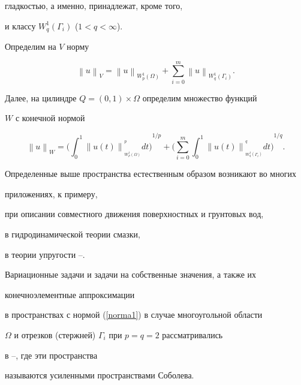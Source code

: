 гладкостью, а именно, принадлежат, кроме того,


и классу $W_q^1(\Gamma_i)$ ($1<q<\infty$).


Определим на $V$ норму


\begin{equation}


{\left\| {u} \right\|}_V={\left\| {u} \right\|}_{W_p^1(\Omega)}+


\sum \limits_{i=0}^{m}


{\left\| {u} \right\|}_{W_q^1(\Gamma_i)}. \label{norma1}


\end{equation}


Далее, на цилиндре $Q=(0,1) \times \Omega$ определим множество функций


$W$ с конечной нормой


\begin{equation}


{\left\| {u} \right\|}_W = {\bigg({\int_{0}^{1} {\left\| {u(t)} \right\|}_


{_{W_p^1(\Omega)}}^{^{p}} dt} \bigg)}^{{1/p}} +


{\bigg( \sum_{i=0}^{m} {\int _{0}^{1} {\left\| {u(t)} \right\|}_


{_{W_q^1(\Gamma_i)}}^{^{q}} dt} \bigg)}^{{1/q}}. \label{norma2}


\end{equation}


Определенные выше пространства естественным образом возникают во многих


приложениях, к примеру,


при описании совместного движения поверхностных и грунтовых вод,


в гидродинамической теории смазки, 


в теории упругости \cite{Anton}--\cite{Daut}.


Вариационные задачи и задачи на собственные значения, а также их


конечноэлементные аппроксимации


в пространствах с нормой (\ref{norma1}) в случае многоугольной области


$\Omega$ и отрезков (стержней) $\Gamma_i$ при $p=q=2$ рассматривались


в \cite{Djak96}--\cite{DjakIzVuz}, где эти пространства


называются усиленными пространствами Соболева.





